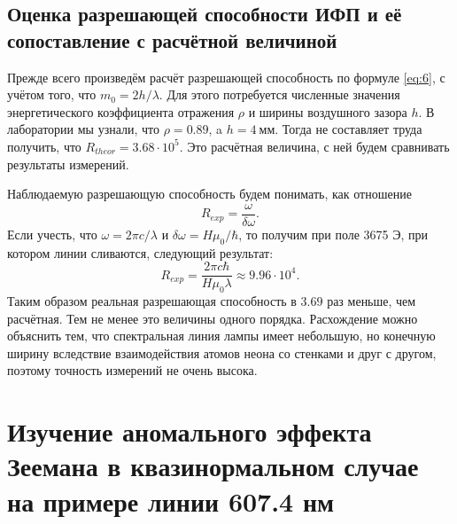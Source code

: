 \documentclass[12pt]{article}
\begin{document}
	\subsection{Оценка разрешающей способности ИФП и её сопоставление с расчётной величиной}
	Прежде всего произведём расчёт разрешающей способность по формуле \ref{eq:6}, с учётом того, что $m_0 = 2h/\lambda$. Для этого потребуется численные значения энергетического коэффициента отражения $\rho$ и ширины воздушного зазора $h$. В лаборатории мы узнали, что $\rho = 0.89$, a $h = 4\ \text{мм}$. Тогда не составляет труда получить, что $R_{theor} = 3.68 \cdot 10^5$. Это расчётная величина, с ней будем сравнивать результаты измерений.
	\par Наблюдаемую разрешающую способность будем понимать, как отношение
	\begin{equation}
		R_{exp} = \dfrac{\omega}{\delta \omega}.
	\end{equation}
	Если учесть, что $\omega = 2\pi c / \lambda$ и $\delta \omega = H\mu_0 / \hbar$, то получим при поле 3675 Э, при котором линии сливаются, следующий результат:
	\begin{equation}
		R_{exp} = \dfrac{2\pi c \hbar}{H \mu_0 \lambda} \approx 9.96 \cdot 10^4.
	\end{equation}
	Таким образом реальная разрешающая способность в $3.69$ раз меньше, чем расчётная. Тем не менее это величины одного порядка. Расхождение можно объяснить тем, что спектральная линия лампы имеет небольшую, но конечную ширину вследствие взаимодействия атомов неона со стенками и друг с другом, поэтому точность измерений не очень высока.

	\section{Изучение аномального эффекта Зеемана в квазинормальном случае на примере линии 607.4 нм}
\end{document}
